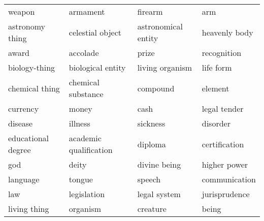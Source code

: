 \documentclass[11pt]{article}
\begin{document}
\begin{table*}[htb]
\begin{center}
{\begin{tabular}{llll}
    weapon                                           & armament                               & firearm                                & arm                                    \\
    astronomy thing                                  & celestial object                       & astronomical entity                    & heavenly body                          \\
    award                                            & accolade                               & prize                                  & recognition                            \\
    biology-thing                                    & biological entity                      & living organism                        & life form                              \\
    chemical thing                                   & chemical substance                     & compound                               & element                                \\
    currency                                         & money                                  & cash                                   & legal tender                           \\
    disease                                          & illness                                & sickness                               & disorder                               \\
    educational degree                               & academic qualification                 & diploma                                & certification                          \\
    god                                              & deity                                  & divine being                           & higher power                           \\
    language                                         & tongue                                 & speech                                 & communication                          \\
    law                                              & legislation                            & legal system                           & jurisprudence                          \\
    living thing                                     & organism                               & creature                               & being                                  \\

\end{tabular}}
\end{center}
\end{table*}
\end{document}
